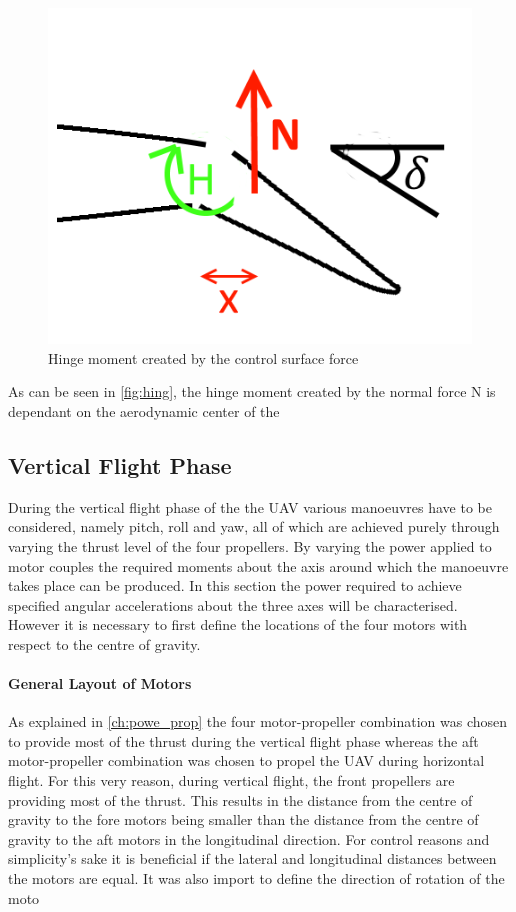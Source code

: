 \begin{figure}[htb]
    \centering
    \includegraphics[scale=1]{./StabilityandControl/Figures/hinge}
    \caption{Hinge moment created by the control surface force}
    \label{fig:hing}
\end{figure}

As can be seen in \autoref{fig:hing}, the hinge moment created by the normal force N is dependant on the aerodynamic center of the 

\subsection{Vertical Flight Phase} %

During the vertical flight phase of the the UAV various manoeuvres have to be considered, namely pitch, roll and yaw, all of which are achieved purely through varying the thrust level of the four propellers. By varying the power applied to motor couples the required moments about the axis around which the manoeuvre takes place can be produced. In this section the power required to achieve specified angular accelerations about the three axes will be characterised. However it is necessary to first define the locations of the four motors with respect to the centre of gravity.

\paragraph{General Layout of Motors}
As explained in \autoref{ch:powe_prop} the four motor-propeller combination was chosen to provide most of the thrust during the vertical flight phase whereas the aft motor-propeller combination was chosen to propel the UAV during horizontal flight. For this very reason, during vertical flight, the front propellers are providing most of the thrust.  This results in the distance from the centre of gravity to the fore motors being smaller than the distance from the centre of gravity to the aft motors in the longitudinal direction. For control reasons and simplicity's sake it is beneficial if the lateral and longitudinal distances between the motors are equal. 
It was also import to define the direction of rotation of the moto

